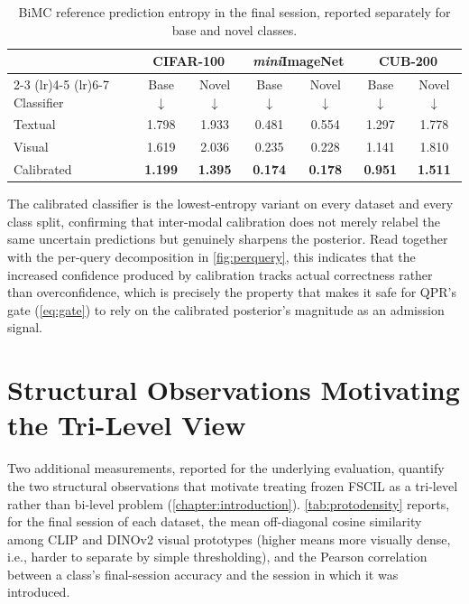 \documentclass{iutbscthesis}
\begin{document}
\begin{table}[H]
    \centering
    \begin{tabular}{l c c c c c c}
        \toprule
        & \multicolumn{2}{c}{CIFAR-100} & \multicolumn{2}{c}{\emph{mini}ImageNet} & \multicolumn{2}{c}{CUB-200} \\
        \cmidrule(lr){2-3} \cmidrule(lr){4-5} \cmidrule(lr){6-7}
        Classifier & Base $\downarrow$ & Novel $\downarrow$ & Base $\downarrow$ & Novel $\downarrow$ & Base $\downarrow$ & Novel $\downarrow$ \\
        \midrule
        Textual & 1.798 & 1.933 & 0.481 & 0.554 & 1.297 & 1.778 \\
        Visual & 1.619 & 2.036 & 0.235 & 0.228 & 1.141 & 1.810 \\
        Calibrated & \textbf{1.199} & \textbf{1.395} & \textbf{0.174} & \textbf{0.178} & \textbf{0.951} & \textbf{1.511} \\
        \bottomrule
    \end{tabular}
    \caption{BiMC reference prediction entropy in the final session, reported separately for base and novel classes.}
    \label{tab:entropy}
\end{table}

The calibrated classifier is the lowest-entropy variant on every dataset and every class split, confirming that inter-modal calibration does not merely relabel the same uncertain predictions but genuinely sharpens the posterior. Read together with the per-query decomposition in \autoref{fig:perquery}, this indicates that the increased confidence produced by calibration tracks actual correctness rather than overconfidence, which is precisely the property that makes it safe for QPR's gate (\autoref{eq:gate}) to rely on the calibrated posterior's magnitude as an admission signal.

\section{Structural Observations Motivating the Tri-Level View}

Two additional measurements, reported for the underlying evaluation, quantify the two structural observations that motivate treating frozen FSCIL as a tri-level rather than bi-level problem (\autoref{chapter:introduction}). \autoref{tab:protodensity} reports, for the final session of each dataset, the mean off-diagonal cosine similarity among CLIP and DINOv2 visual prototypes (higher means more visually dense, i.e., harder to separate by simple thresholding), and the Pearson correlation between a class's final-session accuracy and the session in which it was introduced.
\end{document}
